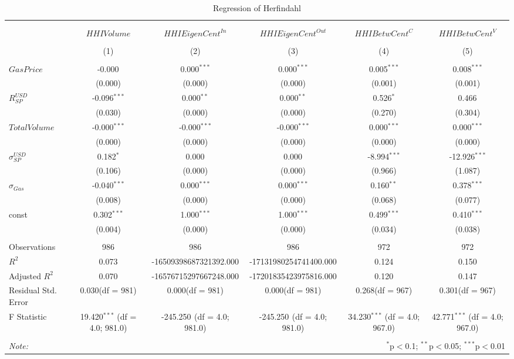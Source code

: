 \begin{table}[!htbp] \centering
  \caption{Regression of Herfindahl}
\begin{tabular}{@{\extracolsep{5pt}}lccccc}
\\[-1.8ex]\hline
\hline \\[-1.8ex]
\\[-1.8ex] & \multicolumn{1}{c}{${	 HHIVolume}$} & \multicolumn{1}{c}{${	 HHIEigenCent}^{In}$} & \multicolumn{1}{c}{${	 HHIEigenCent}^{Out}$} & \multicolumn{1}{c}{${	 HHIBetwCent}^C$} & \multicolumn{1}{c}{${	 HHIBetwCent}^V$}  \\
\\[-1.8ex] & (1) & (2) & (3) & (4) & (5) \\
\hline \\[-1.8ex]
 ${	 GasPrice}$ & -0.000$^{}$ & 0.000$^{***}$ & 0.000$^{***}$ & 0.005$^{***}$ & 0.008$^{***}$ \\
  & (0.000) & (0.000) & (0.000) & (0.001) & (0.001) \\
 ${	 R}^{USD}_{SP}$ & -0.096$^{***}$ & 0.000$^{**}$ & 0.000$^{**}$ & 0.526$^{*}$ & 0.466$^{}$ \\
  & (0.030) & (0.000) & (0.000) & (0.270) & (0.304) \\
 ${	 TotalVolume}$ & -0.000$^{***}$ & -0.000$^{***}$ & -0.000$^{***}$ & 0.000$^{***}$ & 0.000$^{***}$ \\
  & (0.000) & (0.000) & (0.000) & (0.000) & (0.000) \\
 ${	 \sigma}^{USD}_{SP}$ & 0.182$^{*}$ & 0.000$^{}$ & 0.000$^{}$ & -8.994$^{***}$ & -12.926$^{***}$ \\
  & (0.106) & (0.000) & (0.000) & (0.966) & (1.087) \\
 ${	 \sigma}_{Gas}$ & -0.040$^{***}$ & 0.000$^{***}$ & 0.000$^{***}$ & 0.160$^{**}$ & 0.378$^{***}$ \\
  & (0.008) & (0.000) & (0.000) & (0.068) & (0.077) \\
 const & 0.302$^{***}$ & 1.000$^{***}$ & 1.000$^{***}$ & 0.499$^{***}$ & 0.410$^{***}$ \\
  & (0.004) & (0.000) & (0.000) & (0.034) & (0.038) \\
\hline \\[-1.8ex]
 Observations & 986 & 986 & 986 & 972 & 972 \\
 $R^2$ & 0.073 & -16509398687321392.000 & -17131980254741400.000 & 0.124 & 0.150 \\
 Adjusted $R^2$ & 0.070 & -16576715297667248.000 & -17201835423975816.000 & 0.120 & 0.147 \\
 Residual Std. Error & 0.030(df = 981) & 0.000(df = 981) & 0.000(df = 981) & 0.268(df = 967) & 0.301(df = 967)  \\
 F Statistic & 19.420$^{***}$ (df = 4.0; 981.0) & -245.250$^{}$ (df = 4.0; 981.0) & -245.250$^{}$ (df = 4.0; 981.0) & 34.230$^{***}$ (df = 4.0; 967.0) & 42.771$^{***}$ (df = 4.0; 967.0) \\
\hline
\hline \\[-1.8ex]
\textit{Note:} & \multicolumn{5}{r}{$^{*}$p$<$0.1; $^{**}$p$<$0.05; $^{***}$p$<$0.01} \\
\end{tabular}
\end{table}